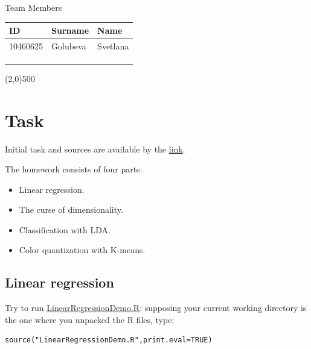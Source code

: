 \documentclass[a4paper,12pt,titlepage]{article} %
\begin{document}
\begin{titlepage}
\vspace{20pt}

\begin{center}
	{\large Team Members}
\end{center}
\begin{tabularx}{\textwidth}{|X|X|X|}
	\hline
	ID & Surname & Name\\
	\hline
	10460625 & Golubeva & Svetlana\\
	\hline
	 &  & \\
	\hline
	 &  & \\
	\hline
	 &  & \\
	\hline
\end{tabularx}

\vspace{\fill}
\begin{center}
	\line(2,0){500}
\end{center}

\end{titlepage}

\tableofcontents

\newpage
\listoftables

\listoffigures

\newpage
\section{Task}
Initial task and sources are available by the \href{http://davide.eynard.it/2016/01/11/statistical-learning-with-r-2016-edition/}{link}. 

The homework consists of four parts:
\begin{itemize}
	\item Linear regression.
	\item The curse of dimensionality.
	\item Classification with LDA.
	\item Color quantization with K-means.
\end{itemize}

\subsection{Linear regression}
Try to run \underline{LinearRegressionDemo.R}: supposing your current working directory is the one where you unpacked the R files, type:
\begin{verbatim}
source("LinearRegressionDemo.R",print.eval=TRUE)
\end{verbatim}
\end{document}
